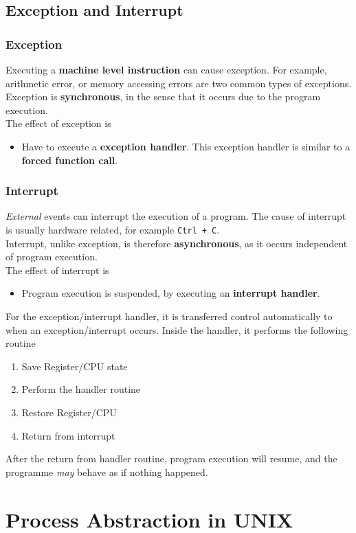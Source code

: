 \documentclass[12pt]{article}
\theoremstyle{definition}
\begin{document}
\subsection{Exception and Interrupt}
\subsubsection{Exception}
Executing a \textbf{machine level instruction} can cause exception. For example, arithmetic error, or memory accessing errors are two common types of exceptions.\\
Exception is \textbf{synchronous}, in the sense that it occurs due to the program execution.\\
The effect of exception is 
\begin{itemize}
  \item Have to execute a \textbf{exception handler}. This exception handler is similar to a \textbf{forced function call}.
\end{itemize}
\subsubsection{Interrupt}
\textit{External} events can interrupt the execution of a program. The cause of interrupt is usually hardware related, for example \texttt{Ctrl + C}.\\
Interrupt, unlike exception, is therefore \textbf{asynchronous}, as it occurs independent of program execution.\\
The effect of interrupt is
\begin{itemize}
  \item Program execution is suspended, by executing an \textbf{interrupt handler}.
\end{itemize}
For the exception/interrupt handler, it is transferred control automatically to when an exception/interrupt occurs. Inside the handler, it performs the following routine
\begin{enumerate}
  \item Save Register/CPU state
  \item Perform the handler routine
  \item Restore Register/CPU
  \item Return from interrupt
\end{enumerate}
After the return from handler routine, program execution will resume, and the programme \textit{may} behave as if nothing happened.

\section{Process Abstraction in UNIX}
\end{document}
